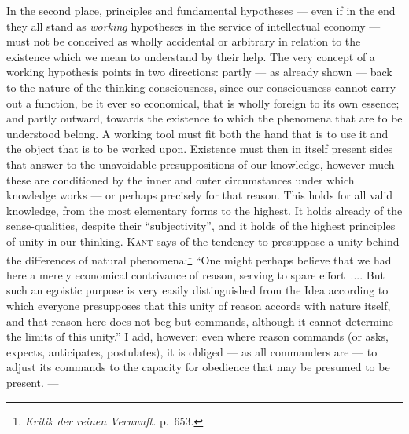 \documentclass[12pt,a4paper]{book}
\newcommand{\opage}[1]{\marginnote{\footnotesize\textit{[#1]}}}
\begin{document}
In the second place, principles and fundamental hypotheses --- even if in the
end they all stand as \emph{working} hypotheses in the service of intellectual
economy --- must not be conceived as wholly accidental or arbitrary in relation
to the existence which we mean to understand by their help. The very concept of
a working hypothesis points in two directions: partly --- as already shown ---
back to the nature of the thinking consciousness, since our consciousness cannot
carry out a function, be it ever so economical, that is wholly foreign to its
own essence; and partly outward, towards the existence to which the phenomena
that are to be understood belong. A working tool must fit both the hand that is
to use it and the object that is to be worked upon. Existence must then in
itself present sides that answer to the unavoidable presuppositions of our
knowledge, however much these are conditioned by the inner and outer
circumstances under which knowledge works --- or perhaps precisely for that
reason. This holds for all valid knowledge, from the most elementary forms to
the highest. It holds already of the sense-qualities, despite their
``subjectivity'', and it holds of the highest principles of unity in our
thinking. \textsc{Kant} says of the tendency to presuppose a unity behind the
differences of natural phenomena:\footnote{\textit{Kritik der reinen Vernunft.}
p.~653.} ``One might perhaps believe that we had here a merely economical
contrivance of reason, serving to spare effort~.... But such an egoistic purpose
is \opage{37}very easily distinguished from the Idea according to which everyone
presupposes that this unity of reason accords with nature itself, and that
reason here does not beg but commands, although it cannot determine the limits
of this unity.'' I add, however: even where reason commands (or asks, expects,
anticipates, postulates), it is obliged --- as all commanders are --- to adjust
its commands to the capacity for obedience that may be presumed to be present.
---
\end{document}
